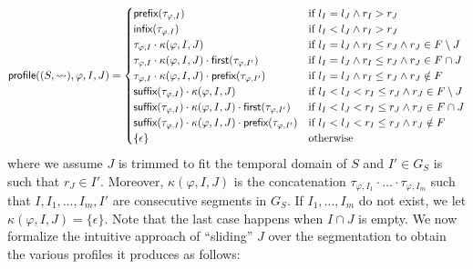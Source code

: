 \vspace{-1em}
\scriptsize
\begin{equation*}
	\mathsf{profile}((S,{\rightsquigarrow}), \varphi, I, J) =
	\begin{cases}
		\textsf{prefix}(\tau_{\varphi,I}) & \text{if } l_I = l_J \land r_I > r_J \\
		\textsf{infix}(\tau_{\varphi,I}) & \text{if } l_I < l_J \land r_I > r_J \\
		\tau_{\varphi,I} \cdot \kappa(\varphi, I, J) & \text{if } l_I = l_J \land r_I \leq r_J \land r_J \in F \setminus J \\
		\tau_{\varphi,I} \cdot \kappa(\varphi, I, J) \cdot \textsf{first}(\tau_{\varphi,I'}) & \text{if } l_I = l_J \land r_I \leq r_J \land r_J \in F \cap J  \\		
		\tau_{\varphi,I} \cdot \kappa(\varphi, I, J) \cdot \textsf{prefix}(\tau_{\varphi,I'}) & \text{if } l_I = l_J \land r_I \leq r_J \land r_J \notin F  \\
		\textsf{suffix}(\tau_{\varphi,I}) \cdot \kappa(\varphi, I, J) & \text{if }  l_I < l_J < r_I \leq r_J \land r_J \in F \setminus J  \\
		\textsf{suffix}(\tau_{\varphi,I}) \cdot \kappa(\varphi, I, J) \cdot \textsf{first}(\tau_{\varphi,I'}) & \text{if } l_I < l_J < r_I \leq r_J \land r_J \in F \cap J \\
		\textsf{suffix}(\tau_{\varphi,I}) \cdot \kappa(\varphi, I, J) \cdot \textsf{prefix}(\tau_{\varphi,I'}) & \text{if } l_I < l_J < r_I \leq r_J \land r_J \notin F \\
		\{\epsilon\} & \text{otherwise}
	\end{cases}
\end{equation*}
\normalsize
where we assume $J$ is trimmed to fit the temporal domain of $S$ and $I' \in G_S$ is such that $r_J \in I'$.
Moreover, $\kappa(\varphi, I, J)$ is the concatenation $\tau_{\varphi,I_1} \cdot \ldots \cdot \tau_{\varphi,I_m}$ such that $I, I_1, \ldots, I_m, I'$ are consecutive segments in $G_S$.
If $I_1, \ldots, I_m$ do not exist, we let $\kappa(\varphi, I, J) = \{\epsilon\}$.
Note that the last case happens when $I \cap J$ is empty.
We now formalize the intuitive approach of ``sliding'' $J$ over the segmentation to obtain the 
various profiles it produces as follows:

